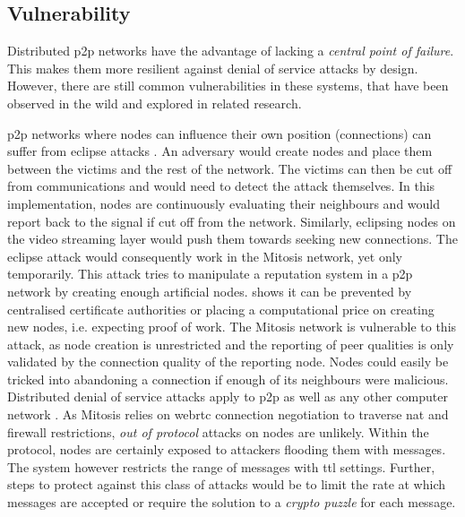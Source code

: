 \subsection{Vulnerability}\label{sec:security-vulnerability}
Distributed \gls{p2p} networks have the advantage of lacking a \textit{central point of failure}. This makes them more resilient against denial of service attacks by design. However, there are still common vulnerabilities in these systems, that have been observed in the wild and explored in related research.
\begin{itemize}
     \gls{p2p} networks where nodes can influence their own position (connections) can suffer from eclipse attacks \cite[\S3]{s_kademlia}. An adversary would create nodes and place them between the victims and the rest of the network. The victims can then be cut off from communications and would need to detect the attack themselves. In this implementation, nodes are continuously evaluating their neighbours and would report back to the signal if cut off from the network. Similarly, eclipsing nodes on the video streaming layer would push them towards seeking new connections. The eclipse attack would consequently work in the Mitosis network, yet only temporarily.
     This attack tries to manipulate a reputation system in a \gls{p2p} network by creating enough artificial nodes. \citet[via BM08]{sybil-attack} shows it can be prevented by centralised certificate authorities or placing a computational price on creating new nodes, i.e. expecting proof of work. The Mitosis network is vulnerable to this attack, as node creation is unrestricted and the reporting of peer qualities is only validated by the connection quality of the reporting node. Nodes could easily be tricked into abandoning a connection if enough of its neighbours were malicious.
     Distributed denial of service attacks apply to \gls{p2p} as well as any other computer network \cite[\S2]{p2p-vulnerabilities}. As Mitosis relies on \gls{webrtc} connection negotiation to traverse \gls{nat} and firewall restrictions, \textit{out of protocol} attacks on nodes are unlikely. Within the protocol, nodes are certainly exposed to attackers flooding them with messages. The system however restricts the range of messages with \gls{ttl} settings. Further, steps to protect against this class of attacks would be to limit the rate at which messages are accepted or require the solution to a \textit{crypto puzzle} for each message.
\end{itemize}
